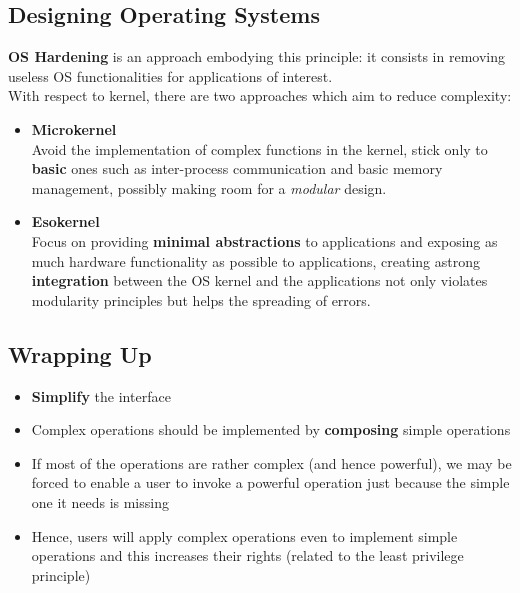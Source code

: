 \subsection{Designing Operating Systems}
\textbf{OS Hardening} is an approach embodying this principle:
it consists in removing useless OS functionalities for applications
of interest.\\
With respect to kernel, there are two approaches which aim to reduce complexity:
\begin{itemize}
   \item \textbf{Microkernel}\\
   Avoid the implementation of complex functions in the kernel,
   stick only to \textbf{basic} ones such as inter-process communication and basic memory management,
   possibly making room for a \textit{modular} design.
   \item \textbf{Esokernel}\\
   Focus on providing \textbf{minimal abstractions} to applications and exposing as much hardware functionality as possible to applications,
   creating astrong \textbf{integration} between the OS kernel and the
   applications not only violates modularity principles
   but helps the spreading of errors.
\end{itemize}

\subsection{Wrapping Up}
\begin{itemize}
   \color{darkgreen}
   \item \textbf{Simplify} the interface
   \item Complex operations should be implemented by \textbf{composing}
   simple operations

\end{itemize}
\begin{itemize}
   \color{darkred}
   \item If most of the operations are rather complex (and hence
   powerful), we may be forced to enable a user to invoke a
   powerful operation just because the simple one it needs is
   missing
   \item Hence, users will apply complex operations even to
   implement simple operations and this increases their rights
   (related to the least privilege principle)
\end{itemize}